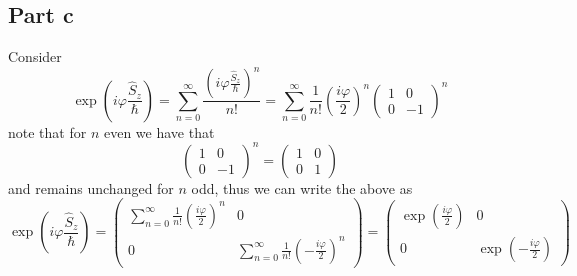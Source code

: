 \documentclass[12pt]{report}
\theoremstyle{custom}
\begin{document}
\subsection*{Part c}
Consider
\begin{equation*}
  \exp\left(i \varphi \frac{\hat{S}_z}{\hbar}\right) = \sum_{n=0}^\infty \frac{\left (i \varphi \frac{\hat{S}_z}{\hbar}\right)^n}{n!} = \sum_{n=0}^\infty \frac{1}{n!}\left(\frac{i\varphi}{2}\right)^n \begin{pmatrix}1 & 0 \\ 0 & -1 \end{pmatrix}^n
\end{equation*}
note that for $n$ even we have that
\begin{equation*}
  \begin{pmatrix} 1 & 0 \\ 0 & -1\end{pmatrix}^n = \begin{pmatrix}1 & 0 \\ 0 & 1 \end{pmatrix}
\end{equation*}
and remains unchanged for $n$ odd, thus we can write the above as
\begin{equation*}
  \exp\left(i \varphi \frac{\hat{S}_z}{\hbar}\right) = \begin{pmatrix}\sum_{n=0}^\infty \frac{1}{n!}\left(\frac{i\varphi}{2}\right)^n & 0 \\
    0 & \sum_{n=0}^\infty \frac{1}{n!}\left(-\frac{i\varphi}{2}\right)^n \end{pmatrix} = \begin{pmatrix} \exp\left(\frac{i\varphi}{2}\right) & 0 \\ 0 & \exp\left(-\frac{i\varphi}{2}\right)\end{pmatrix}
\end{equation*}
\end{document}
